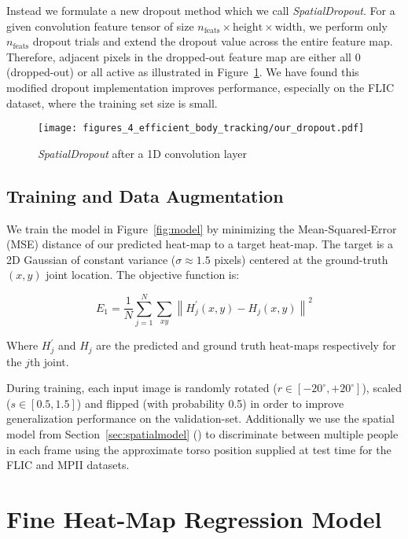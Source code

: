 Instead we formulate a new dropout method which we call \textit{SpatialDropout}. For a given convolution feature tensor of size $n_{\text{feats}}\times\text{height}\times\text{width}$, we perform only $n_{\text{feats}}$ dropout trials and extend the dropout value across the entire feature map. Therefore, adjacent pixels in the dropped-out feature map are either all $0$ (dropped-out) or all active as illustrated in Figure~\ref{fig:dropout_ours}. We have found this modified dropout implementation improves performance, especially on the FLIC dataset, where the training set size is small.

\begin{figure}[ht]
\centering
\texttt{[image: figures\_4\_efficient\_body\_tracking/our\_dropout.pdf]}
   \caption{\textit{SpatialDropout} after a 1D convolution layer}
\label{fig:dropout_ours}
\end{figure}

\subsection{Training and Data Augmentation}
 
We train the model in Figure~\ref{fig:model} by minimizing the Mean-Squared-Error (MSE) distance of our predicted heat-map to a target heat-map. The target is a 2D Gaussian of constant variance ($\sigma \approx 1.5$ pixels) centered at the ground-truth $(x,y)$ joint location. The objective function is:

\begin{equation}
E_1=\frac{1}{N}\sum_{j=1}^{N}{\sum_{xy}{\left\|H_{j}^\prime\left(x,y\right)-H_{j}\left(x,y\right)\right\|^2}}
\label{eq:objfuc}
\end{equation}

Where $H^\prime_j$ and $H_j$ are the predicted and ground truth heat-maps respectively for the $j$th joint.

During training, each input image is randomly rotated ($r\in[-20^{\circ},+20^{\circ}]$), scaled ($s\in[0.5,1.5]$) and flipped (with probability 0.5) in order to improve generalization performance on the validation-set.  Additionally we use the spatial model from Section~\ref{sec:spatialmodel} (\cite{tompsonnips2014}) to discriminate between multiple people in each frame using the approximate torso position supplied at test time for the FLIC and MPII datasets.

\section{Fine Heat-Map Regression Model}
\label{sec:fine_regression_model}

